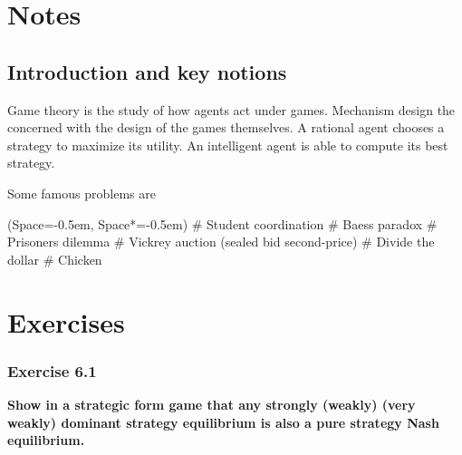 \documentclass[12pt, a4paper]{article}
\title{\Title}
\author{\Author}
\date{Last updated \today.}
\newcommand{\listSpace}{-0.5em}%
\begin{document}
	\maketitle
	\begin{abstract}
		\noindent 
		This document contains notes on game theory and mechanism design.
		
%		
%		
%		
%		
		

	\end{abstract}
	
	{\small \tableofcontents}
	
	
	\clearpage
	
	\section{Notes}
	
	\subsection{Introduction and key notions}
	
	Game theory is the study of how agents act under games.
	Mechanism design the concerned with the design of the games themselves.
	A rational agent chooses a strategy to maximize its utility.
	An intelligent agent is able to compute its best strategy.
	
	Some famous problems are
	\begin{easylist}[itemize]
		\ListProperties(Space=\listSpace, Space*=\listSpace)
		# Student coordination
		# Baess paradox
		# Prisoners dilemma
		# Vickrey auction (sealed bid second-price)
		# Divide the dollar
		# Chicken
	\end{easylist}
	
	
	\clearpage
	\section{Exercises}
	
	\subsubsection*{Exercise 6.1}
	\textbf{Show in a strategic form game that any strongly (weakly) (very weakly) dominant strategy equilibrium is also a pure strategy Nash equilibrium.}
	
\end{document}
